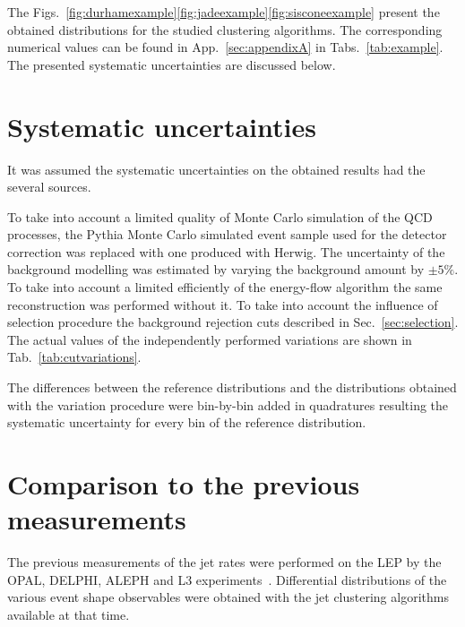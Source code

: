 The Figs.~\ref{fig:durhamexample}\ref{fig:jadeexample}\ref{fig:sisconeexample}
present the obtained distributions for the studied clustering algorithms.
\FIGdurhamexample
\FIGjadeexample
\FIGsisconeexample
The corresponding numerical values can be found in App.~\ref{sec:appendixA}
in Tabs.~\ref{tab:example}. The  presented systematic uncertainties are discussed below.

\FloatBarrier
\section{Systematic uncertainties}
\label{sec:systematic}
It was assumed the
 systematic uncertainties on the obtained results 
 had the several sources.

 To take into account a limited quality of Monte Carlo simulation of the
 QCD processes, the Pythia Monte Carlo simulated event sample used for the detector
 correction was replaced with one produced with Herwig.
 The uncertainty of the background modelling was estimated by varying the 
 background amount by $\pm5\%$.
To take into account a limited efficiently of the energy-flow 
algorithm the same reconstruction was performed without it.
 To take into account the influence of selection procedure
the background rejection cuts described in Sec.~\ref{sec:selection}. %
 The actual values of the independently performed variations are shown in Tab.~\ref{tab:cutvariations}.
 \TABcutvariations
 
The differences between the reference distributions and the distributions obtained with 
the variation procedure were bin-by-bin added in quadratures resulting the systematic uncertainty for 
every bin of the reference distribution.
 


\section{Comparison to the previous measurements}                      
\label{sec:comparison}
The previous measurements of the jet rates were performed on the LEP by 
the OPAL, DELPHI, ALEPH and L3 experiments~\cite{Alexander:1996kh,
Ackerstaff:1997kk,Acton:1992fa,Akrawy:1989rg,Heister:2003aj,Abdallah:2003xz,Achard:2004sv}.
Differential distributions of the various event shape observables were 
obtained with the jet clustering algorithms available at that  time.
